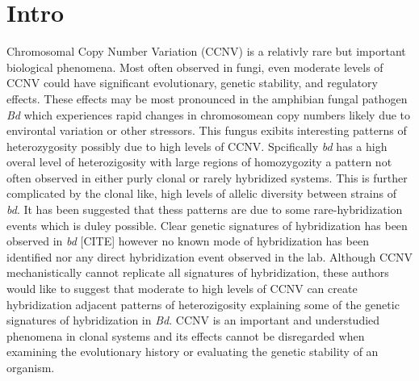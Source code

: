 \documentclass{article}
\begin{document}
\begin{abstract}
\begin{itemize}
            \item Hybridization: The genetic phenomena of two cells or organisms sharing DNA to create a genetlicly hybrid offspring.
            \item Vegitative Compatability: Cell states that allow vegitative hybridization between cells.
            \item Vegitative Hybridization: The specific method of hybridization where two cells merge through some mechanism and share DNA through non meiotic methods.  Note: This is a relativly common mehtod of hybridization in single celled organisms, especially organisms that are undergo only "rare hybridization events".
            \item Point Mutations: The event where a single nucleotide is mutated to a different nucleotide.  This is usually non-consequential or detrimental to the fitness of a cell.  Rarely it will be beneficial.
            \item Single-nucleotide polymorphism: The result of a point mutation.  Usually used when compairing two or more cells
        \end{itemize}
    \end{abstract}


    \section{Intro}
    
    Chromosomal Copy Number Variation (CCNV) is a relativly rare but important biological phenomena.  Most often observed in fungi, even moderate levels of CCNV could have significant evolutionary, genetic stability, and regulatory effects.  These effects may be most pronounced in the amphibian fungal pathogen \textit{Bd} which experiences rapid changes in chromosomean copy numbers likely due to environtal variation or other stressors.  This fungus exibits interesting patterns of heterozygosity possibly due to high levels of CCNV.  Spcifically \textit{bd} has a high overal level of heterozigosity with large regions of homozygozity a pattern not often observed in either purly clonal or rarely hybridized systems.  This is further complicated by the clonal like, high levels of allelic diversity between strains of \textit{bd}.  It has been suggested that thess patterns are due to some rare-hybridization events which is duley possible.  Clear genetic signatures of hybridization has been observed in \textit{bd} [CITE] however no known mode of hybridization has been identified nor any direct hybridization event observed in the lab.  Although CCNV mechanistically cannot replicate all signatures of hybridization, these authors would like to suggest that moderate to high levels of CCNV can create hybridization adjacent patterns of heterozigosity explaining some of the genetic signatures of hybridization in \textit{Bd}.  CCNV is an important and understudied phenomena in clonal systems and its effects cannot be disregarded when examining the evolutionary history or evaluating the genetic stability of an organism.
\end{document}
